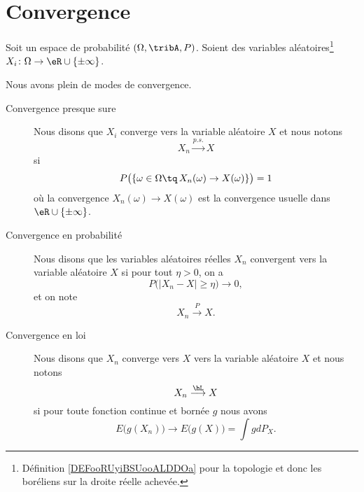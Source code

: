 \section{Convergence}


\begin{definition}      \label{DEFooZKLFooZkKuMC}
	Soit un espace de probabilité \( (\Omega,\tribA,P)\). Soient des variables aléatoires\footnote{Définition \ref{DEFooRUyiBSUooALDDOa} pour la topologie et donc les boréliens sur la droite réelle achevée.} \( X_i\colon \Omega\to \eR\cup\{ \pm\infty \}\).

	Nous avons plein de modes de convergence.
	\begin{description}
		\item[Convergence presque sure]

			Nous disons que \( X_i\) converge  vers la variable aléatoire \( X\) et nous notons
			\begin{equation}
				X_n\stackrel{p.s.}{\longrightarrow}X
			\end{equation}
			si
			\begin{equation}
				P\big( \{ \omega\in\Omega\tq\,X_n(\omega)\to X(\omega) \} \big)=1
			\end{equation}
			où la convergence \( X_n(\omega)\to X(\omega)\) est la convergence usuelle dans \( \eR\cup\{ \pm\infty \}\).
		\item[Convergence en probabilité]
			Nous disons que les variables aléatoires réelles \( X_n\) convergent  vers la variable aléatoire \( X\) si pour tout \( \eta>0\), on a
			\begin{equation}
				P\big( | X_n-X |\geq \eta \big)\to 0,
			\end{equation}
			et on note
			\begin{equation}
				X_n\stackrel{P}{\longrightarrow}X.
			\end{equation}

		\item[Convergence en loi]
			Nous disons que \( X_n\) converge vers \( X\)  vers la variable aléatoire \( X\) et nous notons
			\begin{equation}
				X_n\stackrel{\hL}{\longrightarrow}X
			\end{equation}
			si pour toute fonction continue et bornée \( g\) nous avons
			\begin{equation}
				E\big( g(X_n) \big)\to E\big( g(X) \big)=\int gdP_X.
			\end{equation}


\end{description}
\end{definition}
